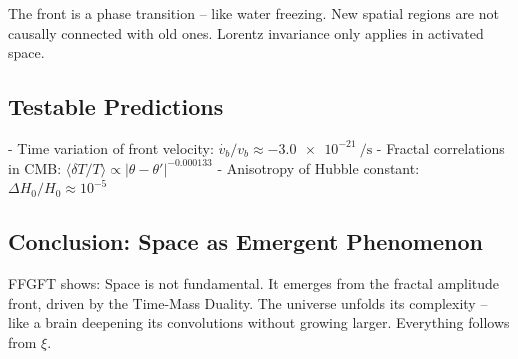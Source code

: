 The front is a phase transition -- like water freezing. New spatial regions are not causally connected with old ones. Lorentz invariance only applies in activated space.

\subsection*{Testable Predictions}

- Time variation of front velocity: $\dot{v_b} / v_b \approx -\SI{3.0e-21}{\per\second}$
- Fractal correlations in CMB: $\langle \delta T / T \rangle \propto |\theta - \theta'|^{-0.000133}$
- Anisotropy of Hubble constant: $\Delta H_0 / H_0 \approx 10^{-5}$

\subsection*{Conclusion: Space as Emergent Phenomenon}

FFGFT shows: Space is not fundamental. It emerges from the fractal amplitude front, driven by the Time-Mass Duality. The universe unfolds its complexity -- like a brain deepening its convolutions without growing larger. Everything follows from $\xi$.




